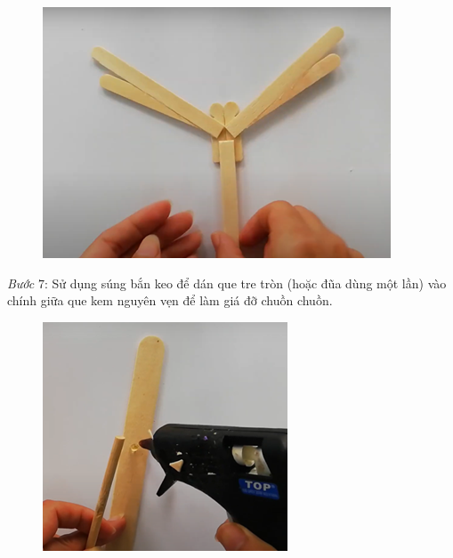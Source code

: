 \begin{multicols}{2}
\begin{figure}[H]
		\includegraphics[width= 1\linewidth]{57}
		\vspace*{-10pt}
	\end{figure}
	\textit{Bước} $7$: Sử dụng súng bắn keo để dán que tre tròn (hoặc đũa dùng một lần) vào chính giữa que kem nguyên vẹn để làm giá đỡ chuồn chuồn.
	\begin{figure}[H]
		\vspace*{-5pt}
		\centering
		\captionsetup{labelformat= empty, justification=centering}
		\includegraphics[width= 1\linewidth]{58}

\end{figure}
\end{multicols}
